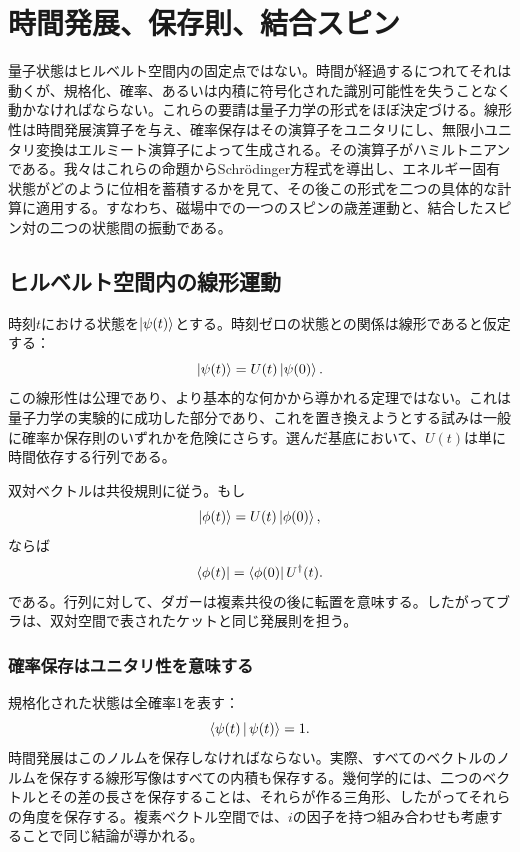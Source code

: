 \chapter{時間発展、保存則、結合スピン}

量子状態はヒルベルト空間内の固定点ではない。時間が経過するにつれてそれは動くが、規格化、確率、あるいは内積に符号化された識別可能性を失うことなく動かなければならない。これらの要請は量子力学の形式をほぼ決定づける。線形性は時間発展演算子を与え、確率保存はその演算子をユニタリにし、無限小ユニタリ変換はエルミート演算子によって生成される。その演算子がハミルトニアンである。我々はこれらの命題からSchr\"odinger方程式を導出し、エネルギー固有状態がどのように位相を蓄積するかを見て、その後この形式を二つの具体的な計算に適用する。すなわち、磁場中での一つのスピンの歳差運動と、結合したスピン対の二つの状態間の振動である。

\section{ヒルベルト空間内の線形運動}

時刻\(t\)における状態を\(\left\lvert\psi(t)\right\rangle\)とする。時刻ゼロの状態との関係は線形であると仮定する：
\begin{equation}
\left\lvert\psi(t)\right\rangle=U(t)\left\lvert\psi(0)\right\rangle.
\end{equation}
この線形性は公理であり、より基本的な何かから導かれる定理ではない。これは量子力学の実験的に成功した部分であり、これを置き換えようとする試みは一般に確率か保存則のいずれかを危険にさらす。選んだ基底において、\(U(t)\)は単に時間依存する行列である。

双対ベクトルは共役規則に従う。もし
\begin{equation}
\left\lvert\phi(t)\right\rangle=U(t)\left\lvert\phi(0)\right\rangle,
\end{equation}
ならば
\begin{equation}
\left\langle\phi(t)\right\rvert=\left\langle\phi(0)\right\rvert U^\dagger(t).
\end{equation}
である。行列に対して、ダガーは複素共役の後に転置を意味する。したがってブラは、双対空間で表されたケットと同じ発展則を担う。

\subsection{確率保存はユニタリ性を意味する}

規格化された状態は全確率1を表す：
\begin{equation}
\left\langle\psi(t)\,\middle|\,\psi(t)\right\rangle=1.
\end{equation}
時間発展はこのノルムを保存しなければならない。実際、すべてのベクトルのノルムを保存する線形写像はすべての内積も保存する。幾何学的には、二つのベクトルとその差の長さを保存することは、それらが作る三角形、したがってそれらの角度を保存する。複素ベクトル空間では、\(i\)の因子を持つ組み合わせも考慮することで同じ結論が導かれる。

